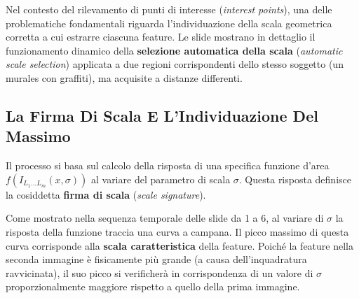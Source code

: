 ﻿\documentclass[11pt, a4paper]{article}
\begin{document}
Nel contesto del rilevamento di punti di interesse (\emph{interest points}), una delle problematiche fondamentali riguarda l'individuazione della scala geometrica corretta a cui estrarre ciascuna feature. Le slide mostrano in dettaglio il funzionamento dinamico della \textbf{selezione automatica della scala} (\emph{automatic scale selection}) applicata a due regioni corrispondenti dello stesso soggetto (un murales con graffiti), ma acquisite a distanze differenti.


\subsection{La Firma Di Scala E L'Individuazione Del Massimo}

Il processo si basa sul calcolo della risposta di una specifica funzione d'area $f(I_{L_1\dots L_m}(x,\sigma))$ al variare del parametro di scala $\sigma$. Questa risposta definisce la cosiddetta \textbf{firma di scala} (\emph{scale signature}).






Come mostrato nella sequenza temporale delle slide da 1 a 6, al variare di $\sigma$ la risposta della funzione traccia una curva a campana. Il picco massimo di questa curva corrisponde alla \textbf{scala caratteristica} della feature. Poiché la feature nella seconda immagine è fisicamente più grande (a causa dell'inquadratura ravvicinata), il suo picco si verificherà in corrispondenza di un valore di $\sigma$ proporzionalmente maggiore rispetto a quello della prima immagine.
\end{document}
